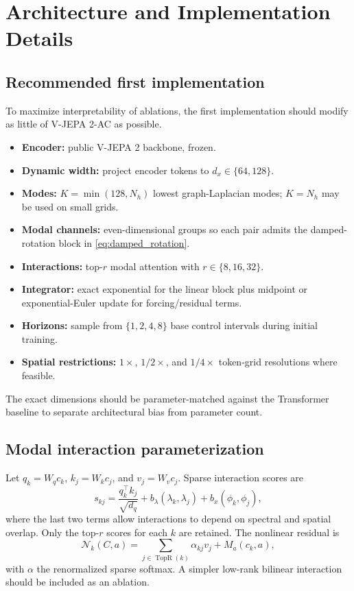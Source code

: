 \documentclass{article}
\theoremstyle{plain}
\theoremstyle{definition}
\theoremstyle{remark}
\begin{document}
\section{Architecture and Implementation Details}
\label{app:implementation}

\subsection{Recommended first implementation}
To maximize interpretability of ablations, the first implementation should modify as little of V-JEPA 2-AC as possible.
\begin{itemize}
    \item \textbf{Encoder:} public V-JEPA 2 backbone, frozen.
    \item \textbf{Dynamic width:} project encoder tokens to $d_x\in\{64,128\}$.
    \item \textbf{Modes:} $K=\min(128,N_h)$ lowest graph-Laplacian modes; $K=N_h$ may be used on small grids.
    \item \textbf{Modal channels:} even-dimensional groups so each pair admits the damped-rotation block in \cref{eq:damped_rotation}.
    \item \textbf{Interactions:} top-$r$ modal attention with $r\in\{8,16,32\}$.
    \item \textbf{Integrator:} exact exponential for the linear block plus midpoint or exponential-Euler update for forcing/residual terms.
    \item \textbf{Horizons:} sample from $\{1,2,4,8\}$ base control intervals during initial training.
    \item \textbf{Spatial restrictions:} $1\times$, $1/2\times$, and $1/4\times$ token-grid resolutions where feasible.
\end{itemize}
The exact dimensions should be parameter-matched against the Transformer baseline to separate architectural bias from parameter count.

\subsection{Modal interaction parameterization}
Let $q_k=W_qc_k$, $k_j=W_kc_j$, and $v_j=W_vc_j$. Sparse interaction scores are
\begin{equation}
s_{kj}
=\frac{q_k^\top k_j}{\sqrt{d_q}}
+b_\lambda(\lambda_k,\lambda_j)
+b_x(\phi_k,\phi_j),
\end{equation}
where the last two terms allow interactions to depend on spectral and spatial overlap. Only the top-$r$ scores for each $k$ are retained. The nonlinear residual is
\begin{equation}
\mathcal{N}_k(C,a)
=\sum_{j\in\operatorname{TopR}(k)}
\alpha_{kj}v_j
+M_a(c_k,a),
\end{equation}
with $\alpha$ the renormalized sparse softmax. A simpler low-rank bilinear interaction should be included as an ablation.
\end{document}
